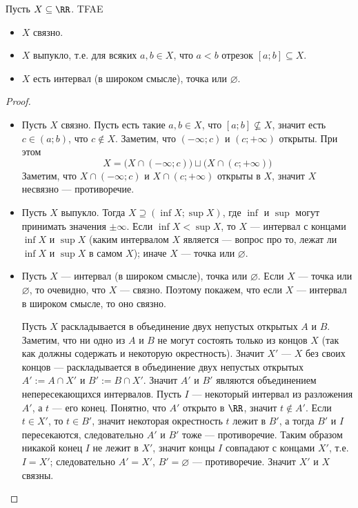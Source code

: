 \documentclass[12pt,a4paper]{article}
\begin{document}
    \begin{theorem}
        Пусть $X \subseteq \RR$. TFAE
        \begin{itemize}
            \item $X$ связно.
            \item $X$ выпукло, т.е. для всяких $a, b \in X$, что $a < b$ отрезок $[a; b] \subseteq X$.
            \item $X$ есть интервал (в широком смысле), точка или $\varnothing$.
        \end{itemize}
    \end{theorem}

    \begin{proof}
        \begin{itemize}
            \item Пусть $X$ связно. Пусть есть такие $a, b \in X$, что $[a; b] \nsubseteq X$, значит есть $c \in (a; b)$, что $c \notin X$. Заметим, что $(-\infty; c)$ и $(c; +\infty)$ открыты. При этом
                \[X = \bigl(X \cap (-\infty; c)\bigr) \sqcup \bigl(X \cap (c; +\infty)\bigr)\]
                Заметим, что $X \cap (-\infty; c)$ и $X \cap (c; +\infty)$ открыты в $X$, значит $X$ несвязно --- противоречие.

            \item Пусть $X$ выпукло. Тогда $X \supseteq (\inf X; \sup X)$, где $\inf$ и $\sup$ могут принимать значения $\pm \infty$. Если $\inf X < \sup X$, то $X$ --- интервал с концами $\inf X$ и $\sup X$ (каким интервалом $X$ является --- вопрос про то, лежат ли $\inf X$ и $\sup X$ в самом $X$); иначе $X$ --- точка или $\varnothing$.

            \item Пусть $X$ --- интервал (в широком смысле), точка или $\varnothing$. Если $X$ --- точка или $\varnothing$, то очевидно, что $X$ --- связно. Поэтому покажем, что если $X$ --- интервал в широком смысле, то оно связно.

                Пусть $X$ раскладывается в объединение двух непустых открытых $A$ и $B$. Заметим, что ни одно из $A$ и $B$ не могут состоять только из концов $X$ (так как должны содержать и некоторую окрестность). Значит $X'$ --- $X$ без своих концов --- раскладывается в объединение двух непустых открытых $A' := A \cap X'$ и $B' := B \cap X'$. Значит $A'$ и $B'$ являются объединением непересекающихся интервалов. Пусть $I$ --- некоторый интервал из разложения $A'$, а $t$ --- его конец. Понятно, что $A'$ открыто в $\RR$, значит $t \notin A'$. Если $t \in X'$, то $t \in B'$, значит некоторая окрестность $t$ лежит в $B'$, а тогда $B'$ и $I$ пересекаются, следовательно $A'$ и $B'$ тоже --- противоречие. Таким образом никакой конец $I$ не лежит в $X'$, значит концы $I$ совпадают с концами $X'$, т.е. $I = X'$; следовательно $A' = X'$, $B' = \varnothing$ --- противоречие. Значит $X'$ и $X$ связны.
        \end{itemize}
    \end{proof}
\end{document}
